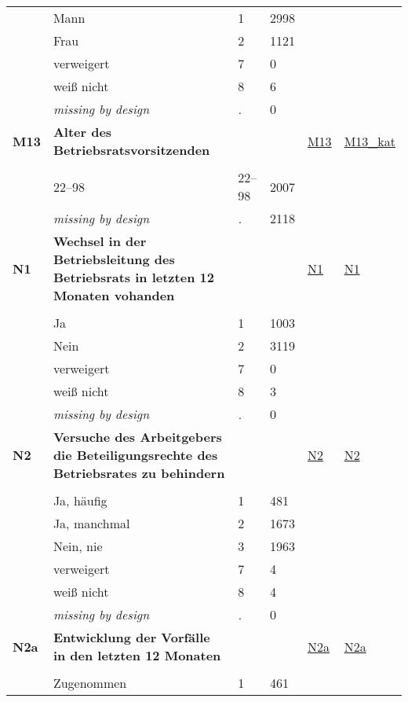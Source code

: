 \begin{longtable}{| L{2.45cm} | L{6cm} | C{1.5cm} | R{1cm} | C{2.25cm} | C{2.25cm} |}
   & Mann & 1 & 2998 &  &  \\ 
   & Frau & 2 & 1121 &  &  \\ 
   & verweigert & 7 & 0 &  &  \\ 
   & weiß nicht & 8 & 6 &  &  \\ 
   & \textit{missing by design} & \textit{.} & 0 &  &  \\ 
   \midrule
\textbf{M13}\label{var:M13} & \textbf{Alter des Betriebsratsvorsitzenden} &  &  & \hyperref[M13]{M13} & \hyperref[var:suf:M13:kat]{M13\_kat} \\ 
   &  &  &  &  &  \\ 
   & 22--98 & 22--98 & 2007 &  &  \\ 
   & \textit{missing by design} & \textit{.} & 2118 &  &  \\ 
   \midrule
\textbf{N1}\label{var:N1} & \textbf{Wechsel in der Betriebsleitung des Betriebsrats in letzten 12 Monaten vohanden} &  &  & \hyperref[N1]{N1} & \hyperref[var:suf:N1]{N1} \\ 
   &  &  &  &  &  \\ 
   & Ja & 1 & 1003 &  &  \\ 
   & Nein & 2 & 3119 &  &  \\ 
   & verweigert & 7 & 0 &  &  \\ 
   & weiß nicht & 8 & 3 &  &  \\ 
   & \textit{missing by design} & \textit{.} & 0 &  &  \\ 
   \midrule
\textbf{N2}\label{var:N2} & \textbf{Versuche des Arbeitgebers die Beteiligungsrechte des Betriebsrates zu behindern} &  &  & \hyperref[N2]{N2} & \hyperref[var:suf:N2]{N2} \\ 
   &  &  &  &  &  \\ 
   & Ja, häufig & 1 & 481 &  &  \\ 
   & Ja, manchmal & 2 & 1673 &  &  \\ 
   & Nein, nie & 3 & 1963 &  &  \\ 
   & verweigert & 7 & 4 &  &  \\ 
   & weiß nicht & 8 & 4 &  &  \\ 
   & \textit{missing by design} & \textit{.} & 0 &  &  \\ 
   \midrule
\textbf{N2a}\label{var:N2a} & \textbf{Entwicklung der Vorfälle in den letzten 12 Monaten} &  &  & \hyperref[N2a]{N2a} & \hyperref[var:suf:N2a]{N2a} \\ 
   &  &  &  &  &  \\ 
   & Zugenommen & 1 & 461 &  &  \\ 

\end{longtable}
